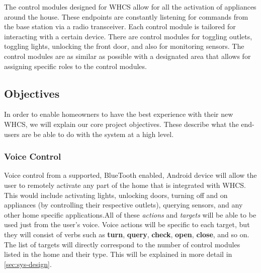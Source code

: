 The control modules designed for WHCS allow for all the activation of
appliances around the house. These endpoints are constantly listening for commands from the base station via a radio transceiver. Each control module is tailored for interacting with a certain device. There are control modules
for toggling outlets, toggling lights, unlocking the front door, and also for
monitoring sensors. The control modules are as similar as possible with a
designated area that allows for assigning specific roles to the control
modules.


\subsection{Objectives}
In order to enable homeowners to have the best experience with their new WHCS,
we will explain our core project objectives. These describe what the end-users
are be able to do with the system at a high level.

\subsubsection{Voice Control}
Voice control from a supported, BlueTooth enabled, Android device will allow
the user to remotely activate any part of the home that is integrated with
WHCS. This would include activating lights, unlocking doors, turning off and on
appliances (by controlling their respective outlets), querying sensors, and any
other home specific applications.\footnotemark All of these \emph{actions} and
\emph{targets} will be able to be used just from the user's voice. Voice
actions will be specific to each target, but they will consist of verbs such as
\textbf{turn}, \textbf{query}, \textbf{check}, \textbf{open}, \textbf{close},
and so on. The list of targets will directly correspond to the number of
control modules listed in the home and their type.  This will be explained in
more detail in \autoref{sec:sys-design}.


